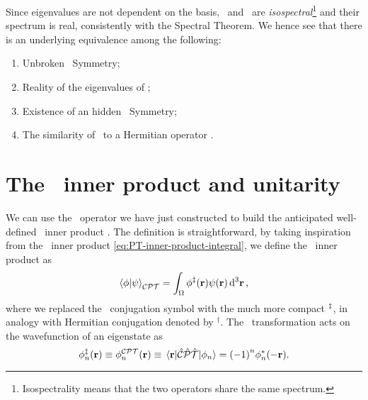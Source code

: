            Since eigenvalues are not dependent on the basis, \hH\ and \hF\ are \emph{isospectral}\footnote{Isospectrality means that the two operators share the same spectrum.} and their spectrum is real, consistently with the Spectral Theorem. We hence see that there is an underlying equivalence among the following:
            \begin{enumerate}[label = \mybullet]
                \item Unbroken \PT\ Symmetry;
                \item Reality of the eigenvalues of \hH;
                \item Existence of an hidden \CPT\ Symmetry;
                \item The similarity of \hH\ to a Hermitian operator \hF.
            \end{enumerate}

    \section{The \CPT\ inner product and unitarity}
        We can use the \hC\ operator we have just constructed to build the anticipated well-defined \CPT\ inner product \cite{bender2024}. The definition is straightforward, by taking inspiration from the \PT\ inner product \eqref{eq:PT-inner-product-integral}, we define the \CPT\ inner product as
        \begin{equation}
            \label{eq:CPT-inner-product}
            \braket{\phi}{\psi}_{\CPT} = \int\nolimits_\Omega \phi^{\myconj}\pqty{\vb{r}} \psi\pqty{\vb{r}} \dd[3]{\vb{r}}
            \mycomma
        \end{equation}
        where we replaced the \CPT\ conjugation symbol with the much more compact $^\ddag$, in analogy with Hermitian conjugation denoted by $^\dag$. The \CPT\ transformation acts on the wavefunction of an eigenstate as 
        \begin{equation}
            \label{eq:CPT-conjugation}
            \phi_n^\myconj\pqty{\vb{r}}
            \equiv \phi_n^{\CPT}\pqty{\vb{r}}
            \equiv \mel{\vb{r}}{\hCPT}{\phi_n}
            = \pqty{-1}^n \phi_n^*\pqty{-\vb{r}}
            \myperiod
        \end{equation}

